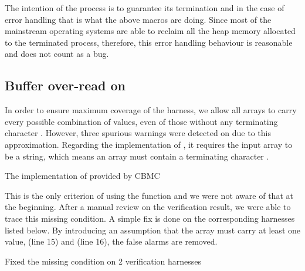 The intention of the process is to guarantee its termination and in the case of error handling that is what the above macros are doing. Since most of the mainstream operating systems are able to reclaim all the heap memory allocated to the terminated process, therefore, this error handling behaviour is reasonable and does not count as a bug.


\subsection{Buffer over-read on }
In order to ensure maximum coverage of the harness, we allow all  arrays to carry every possible combination of values, even of those without any terminating character . However, three spurious warnings were detected on  due to this approximation. Regarding the implementation of , it requires the input  array to be a string, which means an array must contain a terminating character .

\begin{listing}[ht]
\caption{The implementation of  provided by CBMC}
\label{lst:strlen}
\end{listing}

This is the only criterion of using the function  and we were not aware of that at the beginning. After a manual review on the verification result, we were able to trace this missing condition. A simple fix is done on the corresponding harnesses listed below. By introducing an assumption that the  array must carry at least one  value,  (line 15) and  (line 16), the false alarms are removed.

\begin{listing}[ht]

\caption{Fixed the missing condition on 2 verification harnesses}
\end{listing}

